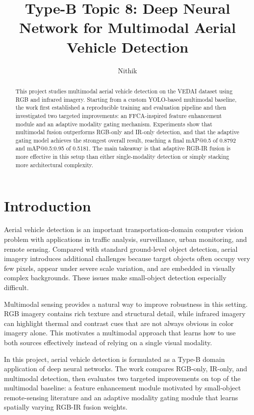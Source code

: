 \documentclass[sigconf,nonacm]{acmart}
\title{Type-B Topic 8: Deep Neural Network for Multimodal Aerial Vehicle Detection}
\author{Nithik}
\affiliation{%
  \institution{Advanced Computer Vision Project}
  \country{United States}
}
\begin{document}
\begin{abstract}
This project studies multimodal aerial vehicle detection on the VEDAI dataset using RGB and infrared imagery. Starting from a custom YOLO-based multimodal baseline, the work first established a reproducible training and evaluation pipeline and then investigated two targeted improvements: an FFCA-inspired feature enhancement module and an adaptive modality gating mechanism. Experiments show that multimodal fusion outperforms RGB-only and IR-only detection, and that the adaptive gating model achieves the strongest overall result, reaching a final mAP@0.5 of 0.8792 and mAP@0.5:0.95 of 0.5181. The main takeaway is that adaptive RGB-IR fusion is more effective in this setup than either single-modality detection or simply stacking more architectural complexity.
\end{abstract}

\maketitle

\section{Introduction}
Aerial vehicle detection is an important transportation-domain computer vision problem with applications in traffic analysis, surveillance, urban monitoring, and remote sensing. Compared with standard ground-level object detection, aerial imagery introduces additional challenges because target objects often occupy very few pixels, appear under severe scale variation, and are embedded in visually complex backgrounds. These issues make small-object detection especially difficult.

Multimodal sensing provides a natural way to improve robustness in this setting. RGB imagery contains rich texture and structural detail, while infrared imagery can highlight thermal and contrast cues that are not always obvious in color imagery alone. This motivates a multimodal approach that learns how to use both sources effectively instead of relying on a single visual modality.

In this project, aerial vehicle detection is formulated as a Type-B domain application of deep neural networks. The work compares RGB-only, IR-only, and multimodal detection, then evaluates two targeted improvements on top of the multimodal baseline: a feature enhancement module motivated by small-object remote-sensing literature and an adaptive modality gating module that learns spatially varying RGB-IR fusion weights.
\end{document}
